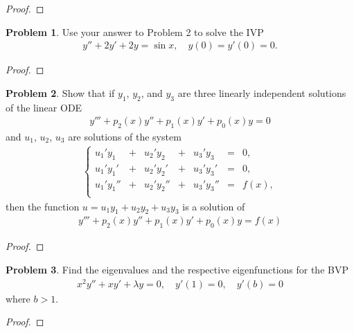 \documentclass[12pt]{article}
\theoremstyle{definition}
\newtheorem{problem}{Problem}
\begin{document}
\begin{proof}
\end{proof}
\newpage


\begin{problem}
  Use your answer to Problem 2 to solve the IVP
  \begin{align*}
    y'' + 2y' + 2y = \sin x, \quad y(0) = y'(0) = 0.
  \end{align*}
\end{problem}

\begin{proof}
\end{proof}
\newpage


\begin{problem}
  Show that if $y_1$, $y_2$, and $y_3$ are three linearly independent solutions
  of the linear ODE
  \begin{align*}
    y''' + p_2(x)y'' + p_1(x)y' + p_0(x) y = 0
  \end{align*}
  and $u_1$, $u_2$, $u_3$ are solutions of the system
  \begin{align*}
    \left\{
      \begin{array}{lllllll}
        u_1'y_1 &+& u_2'y_2 &+& u_3'y_3 &=& 0, \\
        u_1'y_1' &+& u_2'y_2' &+& u_3'y_3' &=& 0, \\
        u_1'y_1'' &+& u_2'y_2'' &+& u_3'y_3'' &=& f(x), \\
      \end{array}
    \right.
  \end{align*}
  then the function $u = u_1 y_1 + u_2 y_2 + u_3 y_3$ is a solution of
  \begin{align*}
    y''' + p_2(x)y'' + p_1(x)y' + p_0(x) y = f(x)
  \end{align*}
\end{problem}

\begin{proof}
\end{proof}
\newpage


\begin{problem}
  Find the eigenvalues and the respective eigenfunctions for the BVP
  \begin{align*}
    x^2y'' + xy' + \lambda y = 0, \quad y'(1) = 0, \quad y'(b) = 0
  \end{align*}
  where $b > 1$.
\end{problem}

\begin{proof}
\end{proof}
\end{document}
